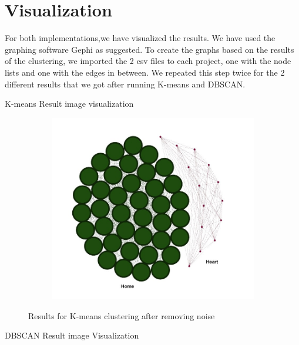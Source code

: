 \documentclass{article}
\begin{document}
\section{Visualization}
        
For both implementations,we have visualized the results. We have used the graphing software Gephi as suggested.
To create the graphs based on the results of the clustering, we imported the 2 csv files to each project, one with the node lists and one with the edges in between. 
We repeated this step twice for the 2 different results that we got after running 
K-means and DBSCAN.


K-means Result image visualization

\begin{figure}[H]
    \begin{subfigure} {1\textwidth}  
        \centering 
        \includegraphics[width=0.8\linewidth]{./img/kmeans.jpeg}
    \end{subfigure}    
    \caption{Results for K-means clustering after removing noise}
    \label{fig:movement}
\end{figure}

DBSCAN Result image Visualization
\end{document}

